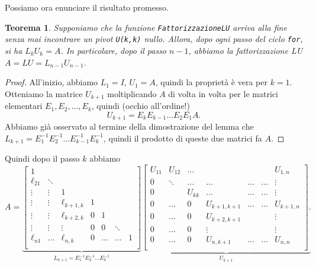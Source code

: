 \documentclass[a4paper]{report}
\newtheorem{theorem}{Teorema}[chapter]
\theoremstyle{definiton}
\theoremstyle{remark}
\begin{document}
Possiamo ora enunciare il risultato promesso.

\begin{theorem}
    Supponiamo che la funzione \lstinline{FattorizzazioneLU} arriva alla fine senza mai incontrare un pivot \lstinline{U(k,k)} nullo. Allora, dopo ogni passo del ciclo \lstinline{for}, si ha $L_k U_k = A$. In particolare, dopo il passo $n-1$, abbiamo la fattorizzazione LU $A = LU = L_{n-1}U_{n-1}$.
\end{theorem}
\begin{proof}
    All'inizio, abbiamo $L_1 = I$, $U_1 = A$, quindi la proprietà è vera per $k=1$. Otteniamo la matrice $U_{k+1}$ moltiplicando $A$ di volta in volta per le matrici elementari $E_1, E_2,\dots, E_k$, quindi (occhio all'ordine!)
    \[
        U_{k+1} = E_k E_{k-1} \dots E_2 E_1 A.
    \]
    Abbiamo già osservato al termine della dimostrazione del lemma che $L_{k+1} = E_1^{-1} E_2^{-1} \dots E_{k-1}^{-1} E_k^{-1}$, quindi il prodotto di queste due matrici fa $A$.
\end{proof}
Quindi dopo il passo $k$ abbiamo
\begin{equation} \label{fattLU}
A = 
\underbrace{
\begin{bmatrix}
    1\\
    \ell_{21} & \ddots\\
    \vdots & \vdots & 1\\
    \vdots & \vdots & \ell_{k+1,k} & 1\\
    \vdots & \vdots & \ell_{k+2,k} & 0 & 1\\
    \vdots & \vdots & \vdots & 0 & 0 & \ddots\\
    \ell_{n1} & \dots & \ell_{n,k} & 0 & \dots & \dots & 1\\
\end{bmatrix}
}_{L_{k+1} = E_1^{-1}E_2^{-1}\dots E_k^{-1}}
\underbrace{
\begin{bmatrix}
    U_{11} & U_{12} & \dots & & & &U_{1,n} \\
    0 & \ddots  & \dots & \dots & \dots &\dots & \vdots\\
    0 & & U_{kk} & \dots & \dots & \dots & \vdots\\
    0 & \dots & 0 & U_{k+1,k+1} & \dots & \dots & U_{k+1,n}\\
    0 & \dots & 0 & U_{k+2,k+1} & & &\vdots\\
    0 & \dots & 0 & \vdots & & & \vdots\\
    0 & \dots & 0 & U_{n,k+1} & \dots & \dots & U_{n,n}\\
\end{bmatrix}.
}_{U_{k+1}}
\end{equation}
\end{document}
